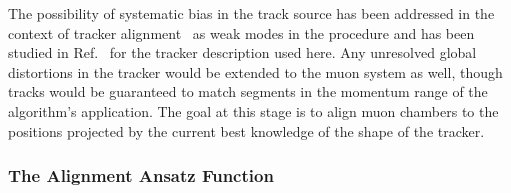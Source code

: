 \documentclass[11pt,twoside,a4paper,cmspaper]{cms-tdr}
\begin{document}
The possibility of systematic bias in the track source has been
addressed in the context of tracker
alignment~\cite{Flucke:2008zz,Stoye:1047047} as weak modes in the
procedure and has been studied in Ref.~\cite{Collaboration:2009sr} for
the tracker description used here.  Any unresolved global
distortions in the tracker would be extended to the muon system as
well, though tracks would be guaranteed to match segments in the
momentum range of the algorithm's application.  The goal at this stage
is to align muon chambers to the positions projected by the current
best knowledge of the shape of the tracker.

\subsubsection{The Alignment Ansatz Function}
\end{document}
